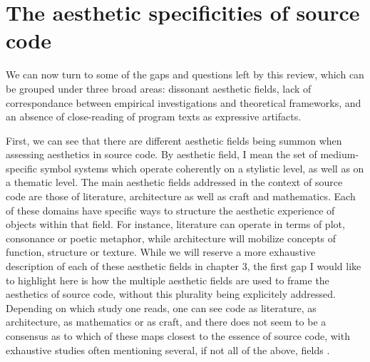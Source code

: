 \section{The aesthetic specificities of source code}

We can now turn to some of the gaps and questions left by this review, which can be grouped under three broad areas: dissonant aesthetic fields, lack of correspondance between empirical investigations and theoretical frameworks, and an absence of close-reading of program texts as expressive artifacts.

First, we can see that there are different aesthetic fields being summon when assessing aesthetics in source code. By aesthetic field, I mean the set of medium-specific symbol systems which operate coherently on a stylistic level, as well as on a thematic level. The main aesthetic fields addressed in the context of source code are those of literature, architecture as well as craft and mathematics. Each of these domains have specific ways to structure the aesthetic experience of objects within that field. For instance, literature can operate in terms of plot, consonance or poetic metaphor, while architecture will mobilize concepts of function, structure or texture. While we will reserve a more exhaustive description of each of these aesthetic fields in chapter 3, the first gap I would like to highlight here is how the multiple aesthetic fields are used to frame the aesthetics of source code, without this plurality being explicitely addressed. Depending on which study one reads, one can see code as literature, as architecture, as mathematics or as craft, and there does not seem to be a consensus as to which of these maps closest to the essence of source code, with exhaustive studies often mentioning several, if not all of the above, fields \citep{rapaport_philosophy_2005}.

